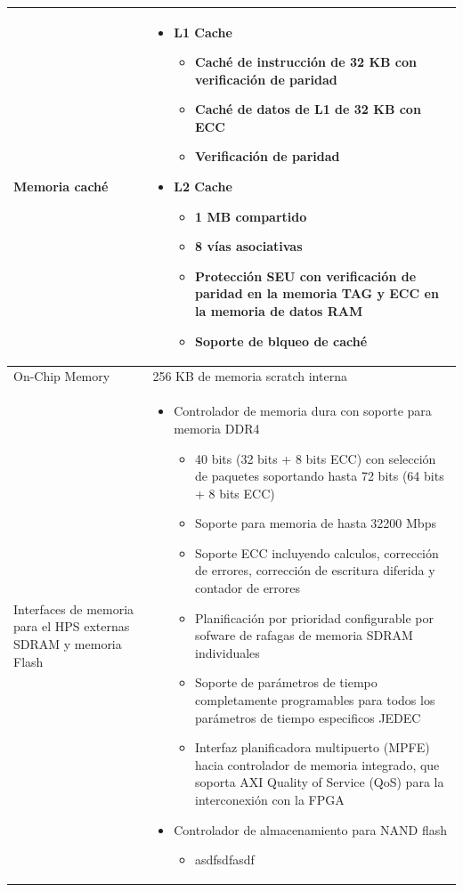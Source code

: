 \begin{longtable}{p{} | p{}}
Memoria caché &
\begin{itemize}
  \item L1 Cache\begin{itemize}
        \item Cach\'e de instrucci\'on de 32 KB con verificaci\'on de paridad
        \item Cach\'e de datos de L1 de 32 KB con ECC
        \item Verificaci\'on de paridad
    \end{itemize}
  \item L2 Cache\begin{itemize}
      \item 1 MB compartido
      \item 8 vías asociativas
      \item Protección SEU con verificaci\'on de paridad en la memoria TAG y ECC en la memoria de datos RAM
    \item Soporte de blqueo de cach\'e
    \end{itemize}
\end{itemize} \\ \midrule

On-Chip Memory &
256 KB de memoria scratch interna \\ \midrule

Interfaces de memoria para el HPS externas SDRAM y memoria Flash &
\begin{itemize}
  \item Controlador de memoria dura con soporte para memoria DDR4 \begin{itemize}
      \item 40 bits (32 bits + 8 bits ECC) con selecci\'on de paquetes soportando hasta 72 bits (64 bits + 8 bits ECC)
      \item Soporte para memoria de hasta 32200 Mbps 
      \item Soporte ECC incluyendo calculos, correcci\'on de errores, correcci\'on de escritura diferida y contador de errores
      \item Planificaci\'on por prioridad configurable por sofware de rafagas de memoria SDRAM individuales
      \item Soporte de par\'ametros de tiempo completamente programables para todos los par\'ametros de tiempo especificos JEDEC
      \item Interfaz planificadora multipuerto (MPFE) hacia controlador de memoria integrado, que soporta AXI Quality of Service (QoS) para la interconexi\'on con la FPGA \end{itemize}
\item Controlador de almacenamiento para NAND flash\begin{itemize}
        \item asdfsdfasdf  
    \end{itemize}
\end{itemize} \\


\end{longtable}

